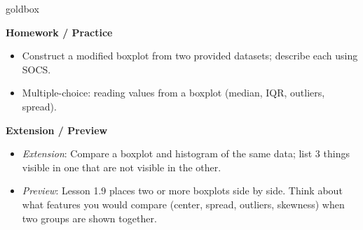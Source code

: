 \documentclass[10pt]{article}
\begin{document}
\begin{skillbox}{goldbox}
\begin{minipage}[t]{0.48\linewidth}
    \textbf{Homework / Practice}
    \begin{itemize}
        \item Construct a modified boxplot from two provided datasets; describe each using SOCS.
        \item Multiple-choice: reading values from a boxplot (median, IQR, outliers, spread).
    \end{itemize}
\end{minipage}
\hfill
\begin{minipage}[t]{0.48\linewidth}
    \textbf{Extension / Preview}
    \begin{itemize}
        \item \textit{Extension}: Compare a boxplot and histogram of the same data; list 3 things visible in one that are not visible in the other.
        \item \textit{Preview}: Lesson 1.9 places two or more boxplots side by side. Think about what features you would compare (center, spread, outliers, skewness) when two groups are shown together.
    \end{itemize}
\end{minipage}
\end{skillbox}
\end{document}
